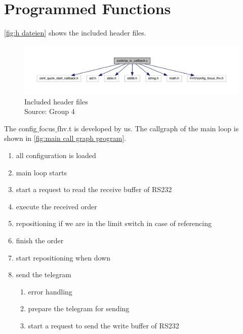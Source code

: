 \documentclass[a4paper,12pt]{scrreprt}
\begin{document}
\section{Programmed Functions}

\autoref{fig:h dateien} shows the included header files.

\begin{figure}[H]
  \centering
   \includegraphics[width=1\textwidth]{pictures/hDateien.pdf}
   \caption[included header files]{Included header files\\
	Source: Group 4  
   }
   \label{fig:h dateien}
\end{figure} 
The config$\_$focus$\_$fhv.t is developed by us. The callgraph of the main loop is shown in \autoref{fig:main call graph program}.\\
\begin{enumerate}
\item all configuration is loaded
\item main loop starts
\item start a request to read the receive buffer of \acs{RS232}
\item execute the received order
\item repositioning if we are in the limit switch in case of referencing
\item finish the order
\item start repositioning when down
\item send the telegram
\begin{enumerate}
\item error handling
\item prepare the telegram for sending
\item start a request to send the write buffer of \acs{RS232}
\end{enumerate}
\end{enumerate}
\end{document}
